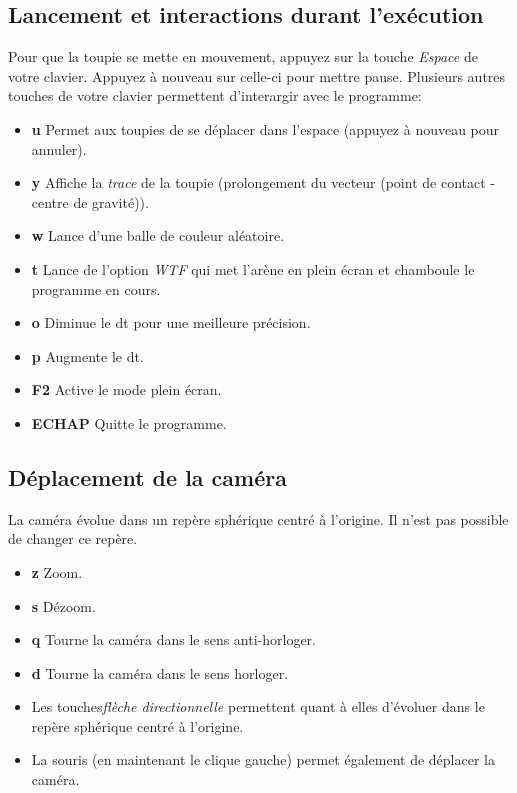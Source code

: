 \documentclass[a4paper]{article}%
\begin{document}
	\subsection {Lancement et interactions durant l'exécution}
		Pour que la toupie se mette en mouvement, appuyez sur  la touche \emph{Espace} de votre clavier. Appuyez à nouveau sur celle-ci pour mettre pause. Plusieurs autres touches de votre clavier permettent d'interargir avec le programme: 
		\begin {itemize} 
			\item[\textbf{u}] Permet aux toupies de se déplacer dans l'espace (appuyez à nouveau pour annuler).
			\item[\textbf{y}] Affiche la \emph{trace} de la toupie (prolongement du vecteur (point de contact - centre de gravité)).
			\item[\textbf{w}] Lance d'une balle de couleur aléatoire.
			\item[\textbf{t}] Lance de l'option \emph {WTF} qui met l'arène en plein écran et chamboule le programme en cours.
			\item[\textbf{o}] Diminue le dt pour une meilleure précision.
			\item[\textbf{p}] Augmente le dt.
			\item[\textbf{F2}] Active le mode plein écran.
			\item[\textbf{ECHAP}] Quitte le programme.
			
		\end {itemize}
	\subsection {Déplacement de la caméra}
		La caméra évolue dans un repère sphérique centré à l'origine. Il n'est pas possible de changer ce repère.
		\begin {itemize}
			\item[\textbf{z}] Zoom.
			\item[\textbf{s}] Dézoom.
			\item[\textbf{q}] Tourne la caméra dans le sens anti-horloger.
			\item[\textbf{d}] Tourne la caméra dans le sens horloger.
			\item Les touches\emph {flèche directionnelle} permettent quant à elles d'évoluer dans le repère sphérique centré à l'origine.
			\item La souris (en maintenant le clique gauche) permet également de déplacer la caméra.
		\end{itemize}
\end{document}
